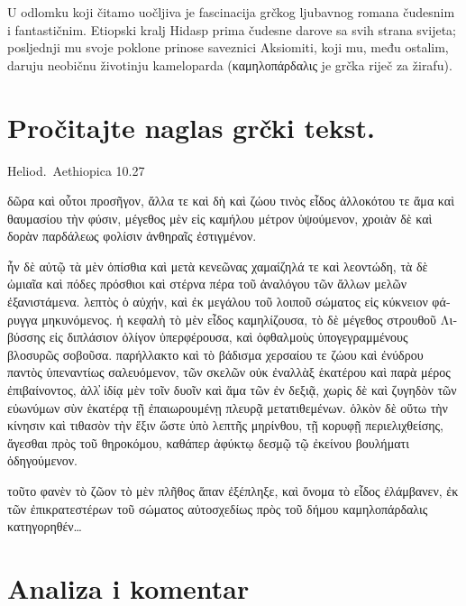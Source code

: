 U odlomku koji čitamo uočljiva je fascinacija grčkog ljubavnog romana čudesnim i fantastičnim. Etiopski kralj Hidasp prima čudesne darove sa svih strana svijeta; posljednji mu svoje poklone prinose saveznici Aksiomiti, koji mu, među ostalim, daruju neobičnu životinju kameloparda (\textgreek[variant=ancient]{καμηλοπάρδαλις} je grčka riječ za žirafu).




\section*{Pročitajte naglas grčki tekst.}

Heliod.\ Aethiopica 10.27

\medskip


{\large

\begin{greek}

\noindent δῶρα καὶ οὗτοι προσῆγον, ἄλλα τε καὶ δὴ καὶ ζώου τινὸς εἶδος ἀλλοκότου τε ἅμα καὶ θαυμασίου τὴν φύσιν, μέγεθος μὲν εἰς καμήλου μέτρον ὑψούμενον, χροιὰν δὲ καὶ δορὰν παρδάλεως φολίσιν ἀνθηραῖς ἐστιγμένον. 

\noindent ἦν δὲ αὐτῷ τὰ μὲν ὀπίσθια καὶ μετὰ κενεῶνας χαμαίζηλά τε καὶ λεοντώδη, τὰ δὲ ὠμιαῖα καὶ πόδες πρόσθιοι καὶ στέρνα πέρα τοῦ ἀναλόγου τῶν ἄλλων μελῶν ἐξανιστάμενα. λεπτὸς ὁ αὐχήν, καὶ ἐκ μεγάλου τοῦ λοιποῦ σώματος εἰς κύκνειον φάρυγγα μηκυνόμενος. ἡ κεφαλὴ τὸ μὲν εἶδος καμηλίζουσα, τὸ δὲ μέγεθος στρουθοῦ Λιβύσσης εἰς διπλάσιον ὀλίγον ὑπερφέρουσα, καὶ ὀφθαλμοὺς ὑπογεγραμμένους βλοσυρῶς σοβοῦσα. παρήλλακτο καὶ τὸ βάδισμα χερσαίου τε ζώου καὶ ἐνύδρου παντὸς ὑπεναντίως σαλευόμενον, τῶν σκελῶν οὐκ ἐναλλὰξ ἑκατέρου καὶ παρὰ μέρος ἐπιβαίνοντος, ἀλλ̓ ἰδίᾳ μὲν τοῖν δυοῖν καὶ ἅμα τῶν ἐν δεξιᾷ, χωρὶς δὲ καὶ ζυγηδὸν τῶν εὐωνύμων σὺν ἑκατέρᾳ τῇ ἐπαιωρουμένῃ πλευρᾷ μετατιθεμένων. ὁλκὸν δὲ οὕτω τὴν κίνησιν καὶ τιθασὸν τὴν ἕξιν ὥστε ὑπὸ λεπτῆς μηρίνθου, τῇ κορυφῇ περιελιχθείσης, ἄγεσθαι πρὸς τοῦ θηροκόμου, καθάπερ ἀφύκτῳ δεσμῷ τῷ ἐκείνου βουλήματι ὁδηγούμενον. 

\noindent τοῦτο φανὲν τὸ ζῶον τὸ μὲν πλῆθος ἅπαν ἐξέπληξε, καὶ ὄνομα τὸ εἶδος ἐλάμβανεν, ἐκ τῶν ἐπικρατεστέρων τοῦ σώματος αὐτοσχεδίως πρὸς τοῦ δήμου καμηλοπάρδαλις κατηγορηθέν\dots


\end{greek}

}


\section*{Analiza i komentar}

